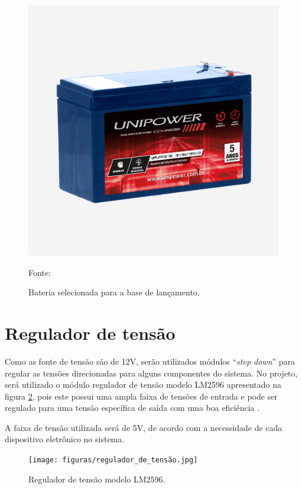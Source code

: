 \begin{figure}[!h]
	\centering
	\label{bateria_base}
		\includegraphics[keepaspectratio=true,scale=0.4]{figuras/bateria_base.jpg}
	\caption{Bateria selecionada para a base de lançamento. }
	{\footnotesize Fonte: \cite{datasheet_bateria}}
	\label{fig:bateriabase}
\end{figure}



\section{Regulador de tensão}

\par Como as fonte de tensão são de 12V, serão utilizados módulos “\textit{step down}” para regular as tensões direcionadas para alguns componentes do sistema. No projeto, será utilizado o módulo regulador de tensão modelo LM2596 apresentado na figura \ref{fig:regulador tensao}, pois este possui uma ampla faixa de tensões de entrada e pode ser regulado para uma tensão específica de saída com uma boa eficiência \cite{datasheet_regulador}.

\par A faixa de tensão utilizada será de 5V, de acordo com a necessidade de cada dispositivo eletrônico no sistema.

\begin{figure}[!h]
	\centering
	\label{regulador_tensão}
		\texttt{[image: figuras/regulador\_de\_tensão.jpg]}
	\caption{Regulador de tensão modelo LM2596.}
	\label{fig:regulador tensao}
\end{figure}

